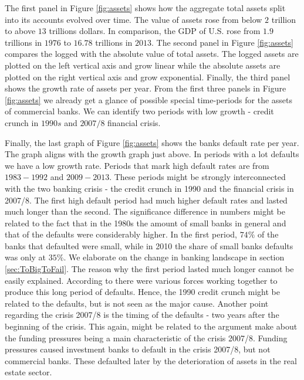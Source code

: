 \documentclass[12pt, a4paper]{article} %
\begin{document}
 
The first panel in Figure \ref{fig:assets} shows how the aggregate total assets split into its accounts evolved over time. The value of assets rose from below $2$ trillion to above $13$ trillions dollars. In comparison, the GDP of U.S. rose from $1.9$ trillions in $1976$ to $16.78$ trillions in $2013$. The second panel in Figure \ref{fig:assets} compares the logged with the absolute value of total assets. The logged assets are plotted on the left vertical axis and grow linear while the absolute assets are plotted on the right vertical axis and grow exponential. Finally, the third panel shows the growth rate of assets per year. From the first three panels in Figure \ref{fig:assets} we already get a glance of possible special time-periods for the assets of commercial banks. We can identify two periods with low growth - credit crunch in $1990s$ and $2007/8$ financial crisis. 
  


\iffalse
Finally, the last graph of Figure \ref{fig:assets} shows the banks default rate per year. The graph aligns with the growth graph just above. In periods with a lot defaults we have a low growth rate. Periods that mark high default rates are from $1983-1992$ and $2009-2013$. These periods might be strongly interconnected with the two banking crisis - the credit crunch in 1990 and the financial crisis in 2007/8. The first high default period had much higher default rates and lasted much longer than the second.
The significance difference in numbers might be related to the fact that in the 1980s the amount of small banks in general and that of the defaults were considerably higher.  In the first period, $74\%$ of the banks that defaulted were small, while in 2010 the share of small banks defaults was only at $35\%$. We elaborate on the change in banking landscape in section \ref{sec:ToBigToFail}. The reason why the first period lasted much longer cannot be easily explained. According to \citet{federal1997history} there were various forces working together to produce this long period of defaults. Hence, the 1990 credit crunch might be related to the defaults, but is not seen as the major cause.
Another point regarding the crisis 2007/8 is the timing of the defaults - two years after the beginning of the crisis. This again, might be related to the argument \cite{antoniades2019commercial} make about the funding pressures being a main characteristic of the crisis 2007/8. Funding pressures caused investment banks to default in the crisis 2007/8, but not commercial banks. These defaulted later by the deterioration of assets in the real estate sector.
\end{document}
